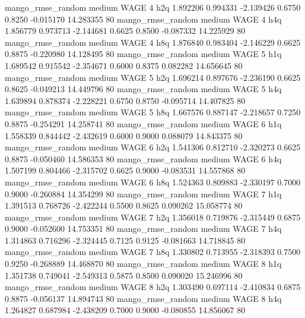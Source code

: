 mango_rmse_random     medium     WAGE                 4                  h2q  1.892206 0.994331 -2.139426 0.6750 0.8250 -0.015170   14.283355 80
mango_rmse_random     medium     WAGE                 4                  h4q  1.856779 0.973713 -2.144681 0.6625 0.8500 -0.087332   14.225929 80
mango_rmse_random     medium     WAGE                 4                  h8q  1.876840 0.983404 -2.146229 0.6625 0.8875 -0.220980   14.128495 80
mango_rmse_random     medium     WAGE                 5                  h1q  1.689542 0.915542 -2.354671 0.6000 0.8375  0.082282   14.656645 80
mango_rmse_random     medium     WAGE                 5                  h2q  1.696214 0.897676 -2.236190 0.6625 0.8625 -0.049213   14.449796 80
mango_rmse_random     medium     WAGE                 5                  h4q  1.639894 0.878374 -2.228221 0.6750 0.8750 -0.095714   14.407825 80
mango_rmse_random     medium     WAGE                 5                  h8q  1.667576 0.887147 -2.218657 0.7250 0.8875 -0.254291   14.258741 80
mango_rmse_random     medium     WAGE                 6                  h1q  1.558339 0.844442 -2.432619 0.6000 0.9000  0.088079   14.843375 80
mango_rmse_random     medium     WAGE                 6                  h2q  1.541306 0.812710 -2.320273 0.6625 0.8875 -0.050460   14.586353 80
mango_rmse_random     medium     WAGE                 6                  h4q  1.507199 0.804466 -2.315702 0.6625 0.9000 -0.083531   14.557868 80
mango_rmse_random     medium     WAGE                 6                  h8q  1.524363 0.809883 -2.330197 0.7000 0.9000 -0.260884   14.354299 80
mango_rmse_random     medium     WAGE                 7                  h1q  1.391513 0.768726 -2.422244 0.5500 0.8625  0.090262   15.058774 80
mango_rmse_random     medium     WAGE                 7                  h2q  1.356018 0.719876 -2.315449 0.6875 0.9000 -0.052600   14.753351 80
mango_rmse_random     medium     WAGE                 7                  h4q  1.314863 0.716296 -2.324445 0.7125 0.9125 -0.081663   14.718845 80
mango_rmse_random     medium     WAGE                 7                  h8q  1.330802 0.713955 -2.318393 0.7500 0.9250 -0.268889   14.468870 80
mango_rmse_random     medium     WAGE                 8                  h1q  1.351738 0.749041 -2.549313 0.5875 0.8500  0.090020   15.246996 80
mango_rmse_random     medium     WAGE                 8                  h2q  1.303490 0.697114 -2.410834 0.6875 0.8875 -0.056137   14.894743 80
mango_rmse_random     medium     WAGE                 8                  h4q  1.264827 0.687984 -2.438209 0.7000 0.9000 -0.080855   14.856067 80
